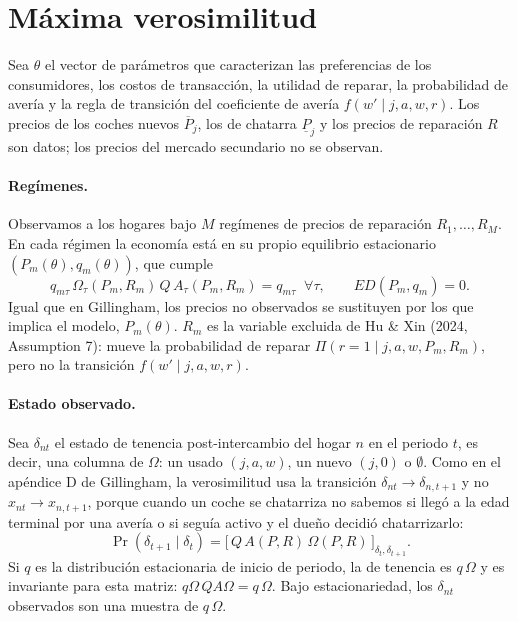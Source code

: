 \documentclass{article}
\begin{document}
\section*{Máxima verosimilitud}


Sea $\theta$ el vector de parámetros que caracterizan las preferencias de los consumidores, los costos de transacción, la utilidad de reparar, la probabilidad de avería y la regla de transición del coeficiente de avería $f(w'\mid j,a,w,r)$. Los precios de los coches nuevos $\overline{P}_j$, los de chatarra $\underline{P}_j$ y los precios de reparación $R$ son datos; los precios del mercado secundario no se observan.

\paragraph{Regímenes.} Observamos a los hogares bajo $M$ regímenes de precios de reparación $R_1,\dots,R_M$. En cada régimen la economía está en su propio equilibrio estacionario $(P_m(\theta),q_m(\theta))$, que cumple
$$q_{m\tau}\,\Omega_\tau(P_m,R_m)\,Q\,A_\tau(P_m,R_m)=q_{m\tau}\;\;\forall\tau,\qquad ED(P_m,q_m)=0 .$$
Igual que en Gillingham, los precios no observados se sustituyen por los que implica el modelo, $P_m(\theta)$. $R_m$ es la variable excluida de Hu \& Xin (2024, Assumption 7): mueve la probabilidad de reparar $\Pi(r=1\mid j,a,w,P_m,R_m)$, pero no la transición $f(w'\mid j,a,w,r)$.

\paragraph{Estado observado.} Sea $\delta_{nt}$ el estado de tenencia post-intercambio del hogar $n$ en el periodo $t$, es decir, una columna de $\Omega$: un usado $(j,a,w)$, un nuevo $(j,0)$ o $\emptyset$. Como en el apéndice D de Gillingham, la verosimilitud usa la transición $\delta_{nt}\to\delta_{n,t+1}$ y no $x_{nt}\to x_{n,t+1}$, porque cuando un coche se chatarriza no sabemos si llegó a la edad terminal por una avería o si seguía activo y el dueño decidió chatarrizarlo:
$$\Pr(\delta_{t+1}\mid\delta_t)=\big[\,Q\,A(P,R)\,\Omega(P,R)\,\big]_{\delta_t,\delta_{t+1}} .$$
Si $q$ es la distribución estacionaria de inicio de periodo, la de tenencia es $q\,\Omega$ y es invariante para esta matriz: $q\Omega\,QA\Omega=q\,\Omega$. Bajo estacionariedad, los $\delta_{nt}$ observados son una muestra de $q\,\Omega$.
\end{document}
